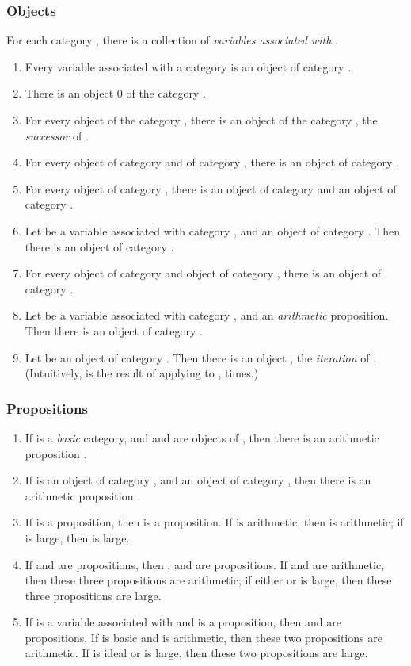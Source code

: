 \documentclass[acmtocl]{acmtrans2m}
\begin{document}
\subsubsection{Objects}
For each category , there is a collection of \emph{variables associated with} .
\begin{enumerate}
 \item Every variable associated with a category  is an object of category .
\item There is an object 0 of the category .
\item For every object  of the category , there is an object  of the category , the \emph{successor} of .
\item For every object  of category  and  of category , there is an object  of category .
\item For every object  of category , there is an object  of category  and an object  of category .
\item Let  be a variable associated with category , and  an object of category .  Then there is an object  of category .
\item For every object  of category  and object  of category , there is an object  of category .
\item Let  be a variable associated with category , and  an \emph{arithmetic} proposition.  Then there is an object  of category .
\item Let  be an object of category .  Then there is an object , the \emph{iteration} of .  (Intuitively,  is the result of applying   to ,  times.)
\end{enumerate}

\subsubsection{Propositions}
\begin{enumerate}
\item
If  is a \emph{basic} category, and  and  are objects of , then there is an arithmetic proposition .
\item
If  is an object of category , and  an object of category , then there is an arithmetic proposition .
\item
If  is a proposition, then  is a proposition.  If  is arithmetic, then  is arithmetic; if  is large, then  is large.
\item
If  and  are propositions, then ,  and  are propositions.  If  and  are arithmetic, then these three propositions are arithmetic; if either  or  is large, then these three propositions are large.
\item
If  is a variable associated with  and  is a proposition, then  and  are propositions.  If  is basic and  is arithmetic, then these two propositions are arithmetic.  If  is ideal or  is large, then these two propositions are large.
\end{enumerate}
\end{document}

